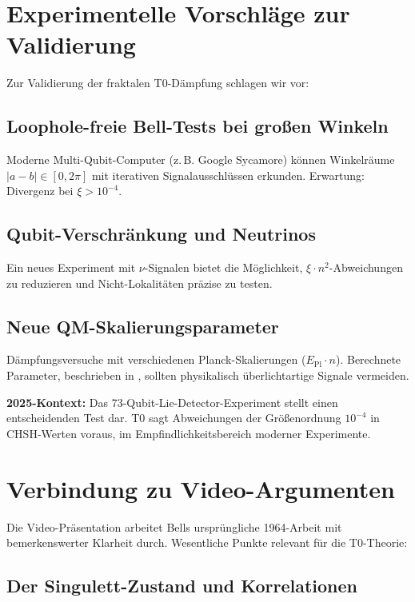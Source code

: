 \section{Experimentelle Vorschläge zur Validierung}
\label{sec:experiments}

Zur Validierung der fraktalen T0-Dämpfung schlagen wir vor:

\subsection{Loophole-freie Bell-Tests bei großen Winkeln}

Moderne Multi-Qubit-Computer (z.\,B. Google Sycamore) können Winkelräume $|a-b| \in [0, 2\pi]$ mit iterativen Signalausschlüssen erkunden. Erwartung: Divergenz bei $\xi > 10^{-4}$.

\subsection{Qubit-Verschränkung und Neutrinos}

Ein neues Experiment mit $\nu$-Signalen bietet die Möglichkeit, $\xi \cdot n^2$-Abweichungen zu reduzieren und Nicht-Lokalitäten präzise zu testen.

\subsection{Neue QM-Skalierungsparameter}

Dämpfungsversuche mit verschiedenen Planck-Skalierungen ($E_{\text{Pl}} \cdot n$). Berechnete Parameter, beschrieben in \cite{keysight2025}, sollten physikalisch überlichtartige Signale vermeiden.

\textbf{2025-Kontext:} Das 73-Qubit-Lie-Detector-Experiment\cite{sciencedaily2025} stellt einen entscheidenden Test dar. T0 sagt Abweichungen der Größenordnung $10^{-4}$ in CHSH-Werten voraus, im Empfindlichkeitsbereich moderner Experimente.

\section{Verbindung zu Video-Argumenten}
\label{sec:video_connection}

Die Video-Präsentation\cite{youtube_bell2025} arbeitet Bells ursprüngliche 1964-Arbeit mit bemerkenswerter Klarheit durch. Wesentliche Punkte relevant für die T0-Theorie:

\subsection{Der Singulett-Zustand und Korrelationen}

